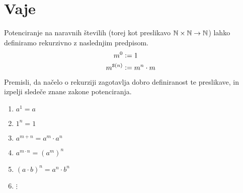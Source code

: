 

\section{Vaje}

\begin{vaja}
Potenciranje na naravnih številih (torej kot preslikavo $\mathbb{N} \times \mathbb{N} \to \mathbb{N}$) lahko definiramo rekurzivno z naslednjim predpisom.
\begin{align*}
m^0 &\mathrel{\mathop:}= 1 \\
m^{\mathtt{S}(n)} &\mathrel{\mathop:}= m^n \cdot m
\end{align*}
Premisli, da načelo o rekurziji zagotavlja dobro definiranost te preslikave, in izpelji sledeče znane zakone potenciranja.
\begin{enumerate}
\item
$a^1 = a$
\item
$1^n = 1$
\item
$a^{m + n} = a^m \cdot a^n$
\item
$a^{m \cdot n} = (a^m)^n$
\item
$(a \cdot b)^n = a^n \cdot b^n$
\item
$\vdots$
\end{enumerate}
\end{vaja}


